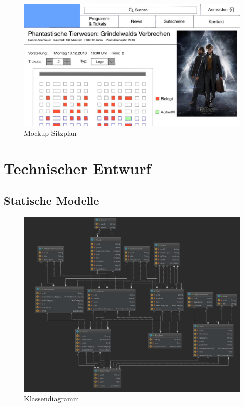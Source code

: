 		\begin{figure}[H]
			\centering 
			\includegraphics[width=14cm]{img/mockUp3.png}
			\captionsetup{format=hang}
			\caption[Mockup Sitzplan]{\label{fig:mockUpSitzplan} Mockup Sitzplan }
		\end{figure}
	
	\section{Technischer Entwurf} 	
		\subsection{Statische Modelle}
			\begin{figure}[H]
				\centering 
				\includegraphics[width=14cm]{img/klassendiagramm.png}
				\captionsetup{format=hang}
				\caption[Klassendiagramm]{\label{fig:klassendiagramm} Klassendiagramm }
			\end{figure}
		
